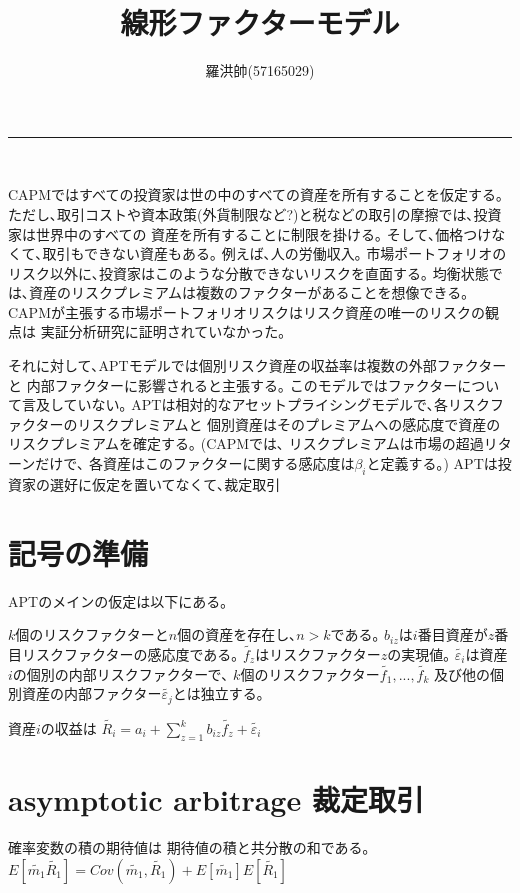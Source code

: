 \documentclass[uplatex,a4paper]{jsarticle}
\title{線形ファクターモデル}
\author{羅洪帥(57165029)}
\date{}
\begin{document}
\maketitle
\hrule
\medskip　　%

CAPMではすべての投資家は世の中のすべての資産を所有することを仮定する｡
ただし､取引コストや資本政策(外貨制限など?)と税などの取引の摩擦では､投資家は世界中のすべての
資産を所有することに制限を掛ける｡
そして､価格つけなくて､取引もできない資産もある｡
例えば､人の労働収入｡
市場ポートフォリオのリスク以外に､投資家はこのような分散できないリスクを直面する｡
均衡状態では､資産のリスクプレミアムは複数のファクターがあることを想像できる｡
CAPMが主張する市場ポートフォリオリスクはリスク資産の唯一のリスクの観点は
実証分析研究に証明されていなかった｡

それに対して､APTモデルでは個別リスク資産の収益率は複数の外部ファクターと
内部ファクターに影響されると主張する｡
このモデルではファクターについて言及していない｡
APTは相対的なアセットプライシングモデルで､各リスクファクターのリスクプレミアムと
個別資産はそのプレミアムへの感応度で資産のリスクプレミアムを確定する｡
(CAPMでは､ リスクプレミアムは市場の超過リターンだけで､
各資産はこのファクターに関する感応度は$\beta_i$と定義する｡)
APTは投資家の選好に仮定を置いてなくて､裁定取引

\section{記号の準備}
APTのメインの仮定は以下にある｡

$k$個のリスクファクターと$n$個の資産を存在し､$n>k$である｡
$b_{iz}$は$i$番目資産が$z$番目リスクファクターの感応度である｡
$\tilde{f_{z}}$はリスクファクター$z$の実現値｡
$\tilde{\varepsilon_i}$は資産$i$の個別の内部リスクファクターで､
$k$個のリスクファクター$\tilde{f_{1}},...,\tilde{f_{k}}$
及び他の個別資産の内部ファクター$\tilde{\varepsilon_j}$とは独立する｡

資産$i$の収益は
$
\tilde{R_i} = a_i + \sum_{z=1}^{k} b_{iz} \tilde{f_{z}} + \tilde{\varepsilon_i}
$

\section{asymptotic arbitrage  裁定取引}



確率変数の積の期待値は 期待値の積と共分散の和である｡
$
E [\widetilde{m_1} \widetilde{R_1}] = Cov(\widetilde{m_1}, \widetilde{R_1}) +  E [\widetilde{m_1} ] E [ \widetilde{R_1}]
$
\end{document}
